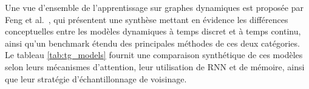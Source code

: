 \documentclass[a4paper,11pt,twoside]{StyleThese}
\begin{document}
\begin{table}[h]
\centering
{}
\caption{Comparaison des principaux modèles de graphes dynamiques en temps continu.}
\label{tab:tg_models}
\end{table}


Une vue d’ensemble de l’apprentissage sur graphes dynamiques est proposée par Feng et al.~\cite{survey_gnn}, qui présentent une synthèse mettant en évidence les différences conceptuelles entre les modèles dynamiques à temps discret et à temps continu, ainsi qu’un benchmark étendu des principales méthodes de ces deux catégories. Le tableau \ref{tab:tg_models} fournit une comparaison synthétique de ces modèles selon leurs mécanismes d’attention, leur utilisation de RNN et de mémoire, ainsi que leur stratégie d’échantillonnage de voisinage.
\end{document}
